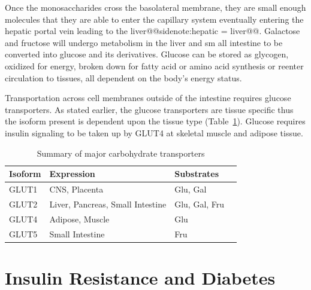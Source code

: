 \documentclass{tufte-handout}
\makeatletter
\def\sidenote#1{@@sidenote:#1@@}
\makeatother
\begin{document}
Once the monosaccharides cross the basolateral membrane, they are small enough molecules that they are able to enter the capillary system eventually entering the hepatic portal vein leading to the liver\sidenote{hepatic = liver}. Galactose and fructose will undergo metabolism in the liver and sm all intestine to be converted into glucose and its derivatives. Glucose can be stored as glycogen, oxidized for energy, broken down for fatty acid or amino acid synthesis or reenter circulation to tissues, all dependent on the body's energy status.

Transportation across cell membranes outside of the intestine requires glucose transporters. As stated earlier, the glucose transporters are
tissue specific thus the isoform present is dependent upon the tissue type (Table~\ref{tab:glut-transporters}). Glucose requires insulin signaling to be taken up by GLUT4 at skeletal muscle and adipose tissue.

\begin{table}[]
\caption{Summary of major carbohydrate transporters}
\begin{tabular}{llll}\toprule\label{tab:glut-transporters}
\textbf{Isoform} & \textbf{Expression}              & \textbf{Substrates} \\ \midrule
GLUT1            & CNS, Placenta                    & Glu, Gal             \\
GLUT2            & Liver, Pancreas, Small Intestine & Glu, Gal, Fru        \\
GLUT4            & Adipose, Muscle                  & Glu                    \\
GLUT5            & Small Intestine                  & Fru                 \\ \bottomrule
\end{tabular}

\end{table}


\section{Insulin Resistance and Diabetes}
\end{document}
